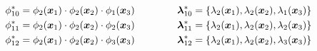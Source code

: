 \documentclass[onecolumn,a4paper,11pt]{article}
\begin{document}
\begin{eqnarray}
%
\phi^{\ast}_{10}= \phi_{2}(\bm{x}_1) \cdot \phi_{2}(\bm{x}_2) \cdot \phi_{1}(\bm{x}_3) \hspace{1.5cm} \bm{\lambda}^{\ast}_{10}= \{\lambda_2(\bm{x}_1), \lambda_2(\bm{x}_2), \lambda_1(\bm{x}_3)\} \nonumber \\
%
\phi^{\ast}_{11}= \phi_{2}(\bm{x}_1) \cdot \phi_{2}(\bm{x}_2) \cdot \phi_{2}(\bm{x}_3) \hspace{1.5cm} \bm{\lambda}^{\ast}_{11}= \{\lambda_2(\bm{x}_1), \lambda_2(\bm{x}_2), \lambda_2(\bm{x}_3)\} \nonumber \\
%
\phi^{\ast}_{12}= \phi_{2}(\bm{x}_1) \cdot \phi_{2}(\bm{x}_2) \cdot \phi_{3}(\bm{x}_3) \hspace{1.5cm} \bm{\lambda}^{\ast}_{12}= \{\lambda_2(\bm{x}_1), \lambda_2(\bm{x}_2), \lambda_3(\bm{x}_3)\} \nonumber
\end{eqnarray}
\end{document}
